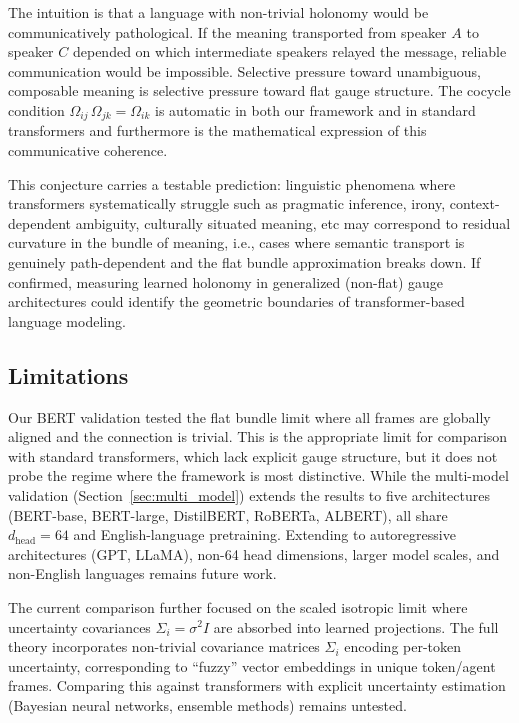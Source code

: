 \documentclass[twoside,11pt]{article}
\begin{document}
The intuition is that a language with non-trivial holonomy would be communicatively pathological. If the meaning transported from speaker $A$ to speaker $C$ depended on which intermediate speakers relayed the message, reliable communication would be impossible. Selective pressure toward unambiguous, composable meaning is selective pressure toward flat gauge structure. The cocycle condition $\Omega_{ij}\,\Omega_{jk} = \Omega_{ik}$ is automatic in both our framework and in standard transformers and furthermore is the mathematical expression of this communicative coherence.

This conjecture carries a testable prediction: linguistic phenomena where transformers systematically struggle such as pragmatic inference, irony, context-dependent ambiguity, culturally situated meaning, etc may correspond to residual curvature in the bundle of meaning, i.e., cases where semantic transport is genuinely path-dependent and the flat bundle approximation breaks down. If confirmed, measuring learned holonomy in generalized (non-flat) gauge architectures could identify the geometric boundaries of transformer-based language modeling.

\subsection{Limitations}

Our BERT validation tested the flat bundle limit where all frames are globally aligned and the connection is trivial. This is the appropriate limit for comparison with standard transformers, which lack explicit gauge structure, but it does not probe the regime where the framework is most distinctive. While the multi-model validation (Section~\ref{sec:multi_model}) extends the results to five architectures (BERT-base, BERT-large, DistilBERT, RoBERTa, ALBERT), all share $d_{\text{head}} = 64$ and English-language pretraining. Extending to autoregressive architectures (GPT, LLaMA), non-64 head dimensions, larger model scales, and non-English languages remains future work.

The current comparison further focused on the scaled isotropic limit where uncertainty covariances $\Sigma_i = \sigma^2 I$ are absorbed into learned projections. The full theory incorporates non-trivial covariance matrices $\Sigma_i$ encoding per-token uncertainty, corresponding to ``fuzzy'' vector embeddings in unique token/agent frames. Comparing this against transformers with explicit uncertainty estimation (Bayesian neural networks, ensemble methods) remains untested.
\end{document}
